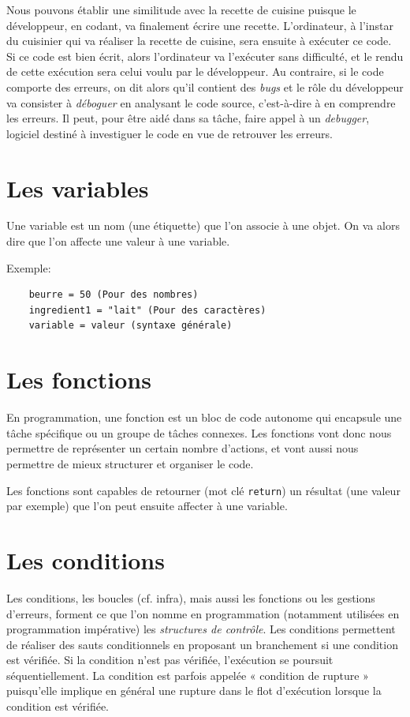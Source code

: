 \documentclass[a4paper,11pt]{book}
\begin{document}
Nous pouvons établir une similitude avec la recette de cuisine puisque le développeur, en codant, va finalement écrire une recette. L'ordinateur, à l'instar du cuisinier qui va réaliser la recette de cuisine, sera ensuite à exécuter ce code. Si ce code est bien écrit, alors l'ordinateur va l'exécuter sans difficulté, et le rendu de cette exécution sera celui voulu par le développeur. Au contraire, si le code comporte des erreurs, on dit alors qu'il contient des \textit{bugs} et le rôle du développeur va consister à \textit{déboguer} en analysant le code source, c'est-à-dire à en comprendre les erreurs. Il peut, pour être aidé dans sa tâche, faire appel à un \textit{debugger}, logiciel destiné à investiguer le code en vue de retrouver les erreurs.
\medskip

\section{Les variables}
Une variable est un nom (une étiquette) que l'on associe à une objet. On va alors dire que l'on affecte une valeur à une variable.
\medskip

Exemple:
\begin{verbatim}
    beurre = 50 (Pour des nombres)
    ingredient1 = "lait" (Pour des caractères)
    variable = valeur (syntaxe générale)
\end{verbatim}
\medskip

\section{Les fonctions}
En programmation, une fonction est un bloc de code autonome qui encapsule une tâche spécifique ou un groupe de tâches connexes. Les fonctions vont donc nous permettre de représenter un certain nombre d'actions, et vont aussi nous permettre de mieux structurer et organiser le code.
\medskip

Les fonctions sont capables de retourner (mot clé \texttt{return}) un résultat (une valeur par exemple) que l'on peut ensuite affecter à une variable.
\medskip

\section{Les conditions}
Les conditions, les boucles (cf. infra), mais aussi les fonctions ou les gestions d'erreurs, forment ce que l'on nomme en programmation (notamment utilisées en programmation impérative) les \textit{structures de contrôle}. Les conditions permettent de réaliser des sauts conditionnels en proposant un branchement si une condition est vérifiée. Si la condition n'est pas vérifiée, l'exécution se poursuit séquentiellement. La condition est parfois appelée « condition de rupture » puisqu'elle implique en général une rupture dans le flot d'exécution lorsque la condition est vérifiée. 
\medskip
\end{document}
